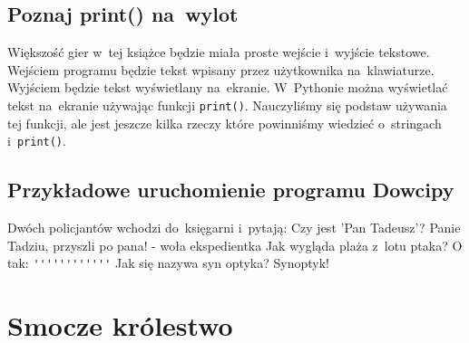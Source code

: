 \documentclass{book}
\begin{document}
\section{Poznaj print() na~wylot}

Większość gier w~tej książce będzie miała proste wejście i~wyjście tekstowe. Wejściem programu będzie tekst wpisany przez użytkownika na~klawiaturze. Wyjściem będzie tekst wyświetlany na~ekranie. W~Pythonie można wyświetlać tekst na~ekranie używając funkcji \lstinline{print()}. Nauczyliśmy się podstaw używania tej funkcji, ale jest jeszcze kilka rzeczy które powinniśmy wiedzieć o~stringach i~\lstinline{print()}.

\section{Przykładowe uruchomienie programu Dowcipy}

\begin{pseudolisting}
Dwóch policjantów wchodzi do~księgarni i~pytają:\linebreak
Czy jest 'Pan Tadeusz'?\linebreak
\linebreak
Panie Tadziu, przyszli po pana! - woła ekspedientka\linebreak
\linebreak
Jak wygląda plaża z~lotu ptaka?\linebreak
\linebreak
O tak: \lstinline{''''''''''''}\linebreak
\linebreak
Jak się nazywa syn optyka?\linebreak
\linebreak
Synoptyk!\linebreak
\end{pseudolisting}


\chapter{Smocze królestwo}
\end{document}
